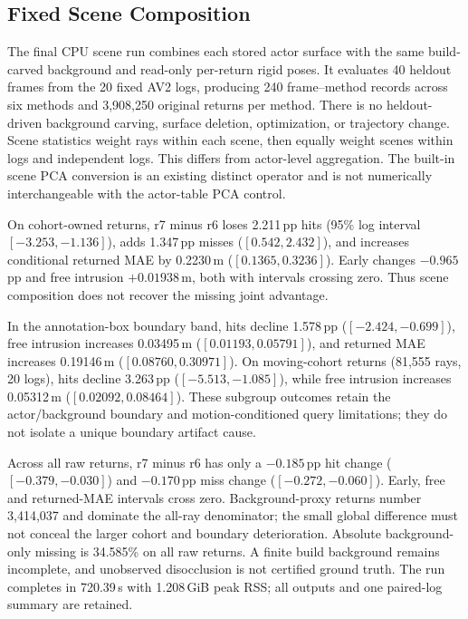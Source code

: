 \subsection{Fixed Scene Composition}
\label{sec:scene}
The final CPU scene run combines each stored actor surface with the same build-carved background and read-only per-return rigid poses. It evaluates 40 heldout frames from the 20 fixed AV2 logs, producing 240 frame--method records across six methods and 3,908,250 original returns per method. There is no heldout-driven background carving, surface deletion, optimization, or trajectory change. Scene statistics weight rays within each scene, then equally weight scenes within logs and independent logs. This differs from actor-level aggregation. The built-in scene PCA conversion is an existing distinct operator and is not numerically interchangeable with the actor-table PCA control.

\begin{table}[t]
\centering\small
\caption{Fixed background composition on all raw returns (3,908,250), cohort-owned returns (432,333) and the annotation-box boundary band (288,014), each spanning 20 logs. Hit/early/miss are percentages; free and returned MAE are meters. Returned MAE is conditional on a finite prediction, so it must be read together with miss. Groups overlap and box ownership/boundaries are proxies, not exact surface annotations.}
\label{tab:scene}
\end{table}
On cohort-owned returns, r7 minus r6 loses 2.211\,pp hits (95\% log interval $[-3.253,-1.136]$), adds 1.347\,pp misses ($[0.542,2.432]$), and increases conditional returned MAE by 0.2230\,m ($[0.1365,0.3236]$). Early changes $-0.965$\,pp and free intrusion $+0.01938$\,m, both with intervals crossing zero. Thus scene composition does not recover the missing joint advantage.

In the annotation-box boundary band, hits decline 1.578\,pp ($[-2.424,-0.699]$), free intrusion increases 0.03495\,m ($[0.01193,0.05791]$), and returned MAE increases 0.19146\,m ($[0.08760,0.30971]$). On moving-cohort returns (81,555 rays, 20 logs), hits decline 3.263\,pp ($[-5.513,-1.085]$), while free intrusion increases 0.05312\,m ($[0.02092,0.08464]$). These subgroup outcomes retain the actor/background boundary and motion-conditioned query limitations; they do not isolate a unique boundary artifact cause.

Across all raw returns, r7 minus r6 has only a $-0.185$\,pp hit change ($[-0.379,-0.030]$) and $-0.170$\,pp miss change ($[-0.272,-0.060]$). Early, free and returned-MAE intervals cross zero. Background-proxy returns number 3,414,037 and dominate the all-ray denominator; the small global difference must not conceal the larger cohort and boundary deterioration. Absolute background-only missing is 34.585\% on all raw returns. A finite build background remains incomplete, and unobserved disocclusion is not certified ground truth. The run completes in 720.39\,s with 1.208\,GiB peak RSS; all outputs and one paired-log summary are retained.
